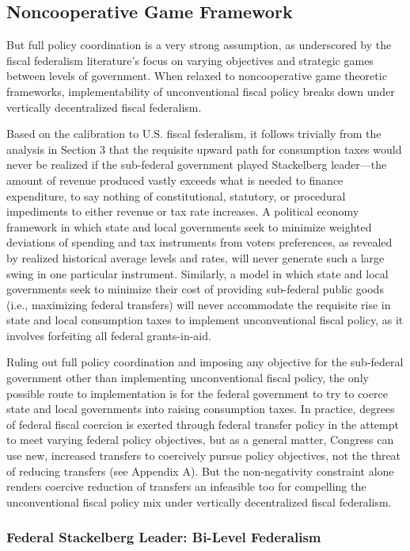 \documentclass[12pt,letterpaper]{article}
\begin{document}
\subsection{Noncooperative Game Framework}

But full policy coordination is a very strong assumption, as underscored by the fiscal federalism literature's  focus on varying objectives and strategic games between levels of government. When relaxed to noncooperative game theoretic frameworks, implementability of unconventional fiscal policy breaks down under vertically decentralized fiscal federalism. 

Based on the calibration to U.S. fiscal federalism, it follows trivially from the analysis in Section 3 that the requisite upward path for consumption taxes would never be realized if the sub-federal government played Stackelberg leader---the amount of revenue produced vastly exceeds what is needed to finance expenditure, to say nothing of constitutional, statutory, or procedural impediments to either revenue or tax rate increases. A political economy framework in which state and local governments seek to minimize weighted deviations of spending and tax instruments from voters preferences, as revealed by realized historical average levels and rates, will never generate such a large swing in one particular instrument. Similarly, a model in which state and local governments seek to minimize their cost of providing sub-federal public goods (i.e., maximizing federal transfers) will never accommodate the requisite rise in state and local consumption taxes to implement unconventional fiscal policy, as it involves forfeiting all federal grants-in-aid. 

Ruling out full policy coordination and imposing any objective for the sub-federal government other than implementing unconventional fiscal policy, the only possible route to implementation is for the federal government to try to coerce state and local governments into raising consumption taxes. In practice, degrees of federal fiscal coercion is exerted through federal transfer policy in the attempt to meet varying federal policy objectives, but as a general matter, Congress can use new, increased transfers to coercively pursue policy objectives, not the threat of reducing transfers (see Appendix A). But the non-negativity constraint alone renders coercive reduction of transfers an infeasible too for compelling the unconventional fiscal policy mix under vertically decentralized fiscal federalism.

\subsubsection{Federal Stackelberg Leader: Bi-Level Federalism}
\end{document}
